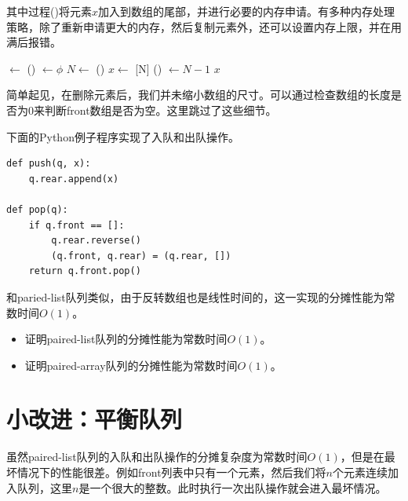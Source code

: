 \documentclass[UTF8]{article}
\begin{document}
其中过程()将元素$x$加入到数组的尾部，并进行必要的内存申请。有多种内存处理策略，除了重新申请更大的内存，然后复制元素外，还可以设置内存上限，并在用满后报错。

\begin{algorithmic}
    \State {} $\gets$ ()
    \State {} $\gets \phi$
  \EndIf
  \State $N \gets$ ()
  \State $x \gets$ [N]
  \State {}() $\gets N - 1$
  \State \Return $x$
\EndFunction
\end{algorithmic}

简单起见，在删除元素后，我们并未缩小数组的尺寸。可以通过检查数组的长度是否为0来判断front数组是否为空。这里跳过了这些细节。

下面的Python例子程序实现了入队和出队操作。

\begin{lstlisting}
def push(q, x):
    q.rear.append(x)

def pop(q):
    if q.front == []:
        q.rear.reverse()
        (q.front, q.rear) = (q.rear, [])
    return q.front.pop()
\end{lstlisting}

和paried-list队列类似，由于反转数组也是线性时间的，这一实现的分摊性能为常数时间$O(1)$。

\begin{Exercise}
\begin{itemize}
\item 证明paired-list队列的分摊性能为常数时间$O(1)$。
\item 证明paired-array队列的分摊性能为常数时间$O(1)$。
\end{itemize}
\end{Exercise}

\section{小改进：平衡队列}

虽然paired-list队列的入队和出队操作的分摊复杂度为常数时间$O(1)$，但是在最坏情况下的性能很差。例如front列表中只有一个元素，然后我们将$n$个元素连续加入队列，这里$n$是一个很大的整数。此时执行一次出队操作就会进入最坏情况。
\end{document}
